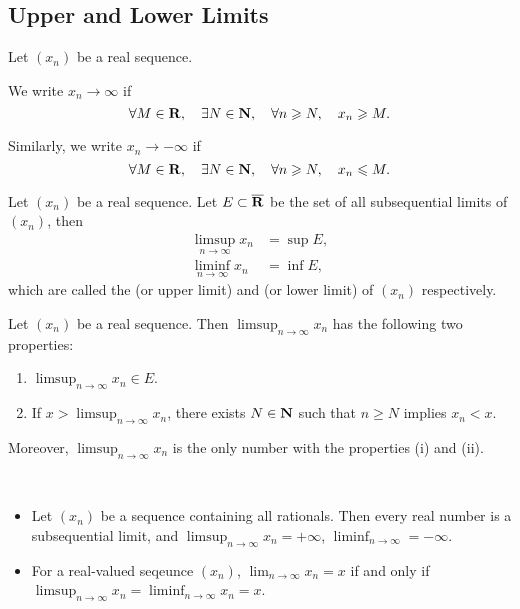 \subsection{Upper and Lower Limits}
Let $(x_n)$ be a real sequence.

\begin{definition}
We write $x_n\to\infty$ if
\[\forall M\in\mathbf R,\quad\exists N\in\mathbf N,\quad\forall n\geqslant N,\quad x_n\geqslant M.\]

Similarly, we write $x_n\to-\infty$ if 
\[\forall M\in\mathbf R,\quad\exists N\in\mathbf N,\quad\forall n\geqslant N,\quad x_n\leqslant M.\]
\end{definition}

\begin{definition}\label{defn:upper-lower-limit}
Let $(x_n)$ be a real sequence. Let $E\subset\overline{\mathbf R}$ be the set of all subsequential limits of $(x_n)$, then 
\begin{align*}
\limsup_{n\to\infty}x_n&=\sup E,\\
\liminf_{n\to\infty}x_n&=\inf E,
\end{align*}
which are called the  (or upper limit) and  (or lower limit) of $(x_n)$ respectively.
\end{definition}

\begin{proposition}
Let $(x_n)$ be a real sequence. Then $\displaystyle\limsup_{n\to\infty}x_n$ has the following two properties:
\begin{enumerate}[label=(\roman*)]
\item $\displaystyle\limsup_{n\to\infty}x_n\in E$.
\item If $\displaystyle x>\limsup_{n\to\infty}x_n$, there exists $N\in\mathbf N$ such that $n\ge N$ implies $x_n<x$.
\end{enumerate}
Moreover, $\displaystyle\limsup_{n\to\infty}x_n$ is the only number with the properties (i) and (ii).
\end{proposition}

\begin{example} \
\begin{itemize}
\item Let $(x_n)$ be a sequence containing all rationals. Then every real number is a subsequential limit, and $\limsup_{n\to\infty}x_n=+\infty$, $\liminf_{n\to\infty}=-\infty$.
\item For a real-valued seqeunce $(x_n)$, $\lim_{n\to\infty}x_n=x$ if and only if $\limsup_{n\to\infty}x_n=\liminf_{n\to\infty}x_n=x$.
\end{itemize}
\end{example}

